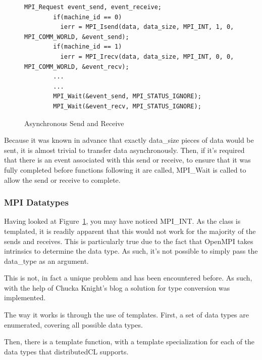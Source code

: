 \documentclass[../thesis.tex]{subfiles}
\begin{document}
    \begin{figure}[htbp]
      \centering

      \lstset{language=cpp}  
      \begin{lstlisting}[tabsize=2]
        MPI_Request event_send, event_receive;
        if(machine_id == 0)
          ierr = MPI_Isend(data, data_size, MPI_INT, 1, 0, MPI_COMM_WORLD, &event_send);
        if(machine_id == 1)
          ierr = MPI_Irecv(data, data_size, MPI_INT, 0, 0, MPI_COMM_WORLD, &event_recv);
        ...
        ...
        MPI_Wait(&event_send, MPI_STATUS_IGNORE);
        MPI_Wait(&event_recv, MPI_STATUS_IGNORE);

        \end{lstlisting}

      \caption{Asynchronous Send and Receive}
      \label{fig:async_send_recv}
    \end{figure}

    Because it was known in advance that exactly data\_size pieces of data would be sent, it is almost trivial to transfer data asynchronously. Then, if it's required that there is an event associated with this send or receive, to ensure that it was fully completed before functions following it are called, MPI\_Wait is called to allow the send or receive to complete.


  \subsubsection{MPI Datatypes} %
  \label{ssub:mpi_datatypes}
    Having looked at Figure~\ref{fig:async_send_recv}, you may have noticed MPI\_INT. As the class is templated, it is readily apparent that this would not work for the majority of the sends and receives. This is particularly true due to the fact that OpenMPI takes intrinsics to determine the data type. As such, it's not possible to simply pass the data\_type as an argument.

    This is not, in fact a unique problem and has been encountered before. As such, with the help of Chucka Knight's blog\cite{chuckaknightintrinsictypeconversion} a solution for type conversion was implemented.

    The way it works is through the use of templates. First, a set of data types are enumerated, covering all possible data types.

    Then, there is a template function, with a template specialization for each of the data types that distributedCL supports.
\end{document}
